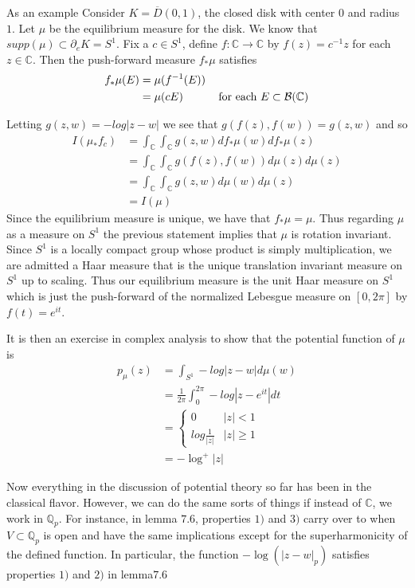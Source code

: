 \documentclass{amsart}
\newcommand{\C}{\mathbb{C}}
\newcommand{\Q}{\mathbb{Q}}
\newcommand{\MCB}{\mathcal{B}}
\begin{document}
As an example Consider $K = \overline{D}(0,1)$, the closed disk with center $0$ and radius $1$. Let $\mu$ be the equilibrium measure for the disk. We know that $supp(\mu) \subset \partial_eK = S^1$. Fix a $c \in S^1$, define $f:\C \rightarrow \C$ by $f(z) = c^{-1}z$ for each $z \in \C$. Then the push-forward measure $f_*\mu$ satisfies \begin{align*}
f_*\mu(E) 
&= \mu(f^{-1}(E)) \\
&= \mu(cE) \hspace{10mm}\text{ for each } E \subset \MCB(\C) 
\end{align*}

Letting $g(z,w) = -log|z-w|$ we see that $g(f(z),f(w)) = g(z,w)$ and so 
\begin{align*}
I(\mu_*f_c) 
&= \int_{\C}\int_{\C}g(z,w)df_*\mu(w)df_*\mu(z)\\
&= \int_{\C}\int_{\C}g(f(z),f(w))d\mu(z)d\mu(z)\\
&= \int_{\C}\int_{\C}g(z,w)d\mu(w)d\mu(z)\\
&= I(\mu)
\end{align*} 
Since the equilibrium measure is unique, we have that $f_*\mu = \mu$. Thus regarding $\mu$ as a measure on $S^1$ the previous statement implies that $\mu$ is rotation invariant. Since $S^1$ is a locally compact group whose product is simply multiplication, we are admitted a Haar measure that is the unique translation invariant measure on $S^1$ up to scaling. Thus our equilibrium measure is the unit Haar measure on $S^1$ which is just the push-forward of the normalized Lebesgue measure on $[0,2\pi]$ by $f(t) = e^{it}$.

It is then an exercise in complex analysis to show that the potential function of $\mu$ is 
\begin{align*}
p_\mu(z) 
&= \int_{S^1}-log|z-w|d\mu(w)\\
&= \frac{1}{2\pi}\int_0^{2\pi}-log|z-e^{it}|dt\\
&= \begin{cases} 0 & |z|<1 \\ log\frac{1}{|z|} & |z| \geq
1
\end{cases}\\
&= -\log^+|z|
\end{align*} 

Now everything in the discussion of potential theory so far has been in the classical flavor. However, we can do the same sorts of things if instead of $\C$, we work in $\Q_p$. For instance, in lemma $7.6$, properties $1)$ and $3)$ carry over to when $V \subset \Q_p$ is open and have the same implications except for the superharmonicity of the defined function. In particular, the function $-\log(|z-w|_p)$ satisfies properties $1)$ and $2)$ in lemma$ 7.6$ 
\end{document}
